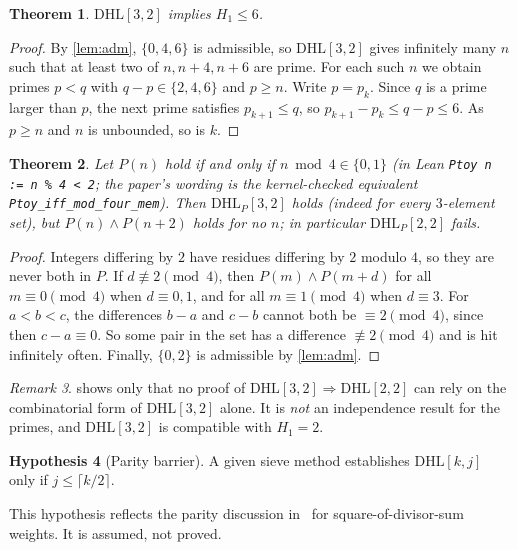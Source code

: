 \documentclass[11pt]{amsart}
\theoremstyle{plain}
\newtheorem{theorem}{Theorem}[section]
\theoremstyle{definition}
\newtheorem{hypothesis}[theorem]{Hypothesis}
\theoremstyle{remark}
\newtheorem{remark}[theorem]{Remark}
\newcommand{\DHL}{\mathrm{DHL}}
\begin{document}
\begin{theorem}\label{thm:main}
$\DHL[3,2]$ implies $H_1\le6$.
\end{theorem}
\begin{proof}
By \cref{lem:adm}, $\{0,4,6\}$ is admissible, so $\DHL[3,2]$ gives infinitely many $n$ such that at least two of $n,n+4,n+6$ are prime. For each such $n$ we obtain primes $p<q$ with $q-p\in\{2,4,6\}$ and $p\ge n$. Write $p=p_k$. Since $q$ is a prime larger than $p$, the next prime satisfies $p_{k+1}\le q$, so $p_{k+1}-p_k\le q-p\le6$. As $p\ge n$ and $n$ is unbounded, so is $k$.
\end{proof}

\begin{theorem}\label{thm:model}
Let $P(n)$ hold if and only if $n\bmod4\in\{0,1\}$ (in Lean \texttt{Ptoy n := n \% 4 < 2}; the paper's wording is the kernel-checked equivalent \texttt{Ptoy\_iff\_mod\_four\_mem}). Then $\DHL_P[3,2]$ holds (indeed for every $3$-element set), but $P(n)\wedge P(n+2)$ holds for no $n$; in particular $\DHL_P[2,2]$ fails.
\end{theorem}
\begin{proof}
Integers differing by $2$ have residues differing by $2$ modulo $4$, so they are never both in $P$. If $d\not\equiv2\pmod4$, then $P(m)\wedge P(m+d)$ for all $m\equiv0\pmod 4$ when $d\equiv0,1$, and for all $m\equiv1\pmod4$ when $d\equiv3$. For $a<b<c$, the differences $b-a$ and $c-b$ cannot both be $\equiv2\pmod4$, since then $c-a\equiv0$. So some pair in the set has a difference $\not\equiv2\pmod 4$ and is hit infinitely often. Finally, $\{0,2\}$ is admissible by \cref{lem:adm}.
\end{proof}

\begin{remark}\label{rem:model}
 shows only that no proof of $\DHL[3,2]\Rightarrow\DHL[2,2]$ can rely on the combinatorial form of $\DHL[3,2]$ alone. It is \emph{not} an independence result for the primes, and $\DHL[3,2]$ is compatible with $H_1=2$.
\end{remark}

\begin{hypothesis}[Parity barrier]\label{hyp:parity}
A given sieve method establishes $\DHL[k,j]$ only if $j\le\lceil k/2\rceil$.
\end{hypothesis}

This hypothesis reflects the parity discussion in~\cite{Polymath} for square-of-divisor-sum weights. It is assumed, not proved.
\end{document}
